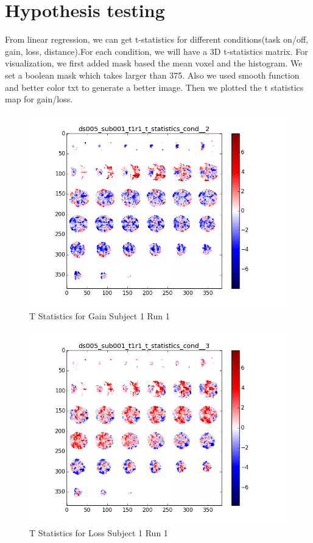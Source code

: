 \section {Hypothesis testing}
From linear regression, we can get t-statistics for different conditions(task on/off, gain, loss, distance).For each condition, we will have a 3D t-statistics matrix. For visualization, we first added mask based the mean voxel and the histogram. We set a boolean mask which takes larger than 375. Also we used smooth function and better color txt to generate a better image. Then we plotted the t statistics map for gain/loss. 
\begin{figure}[H] 
\centering \includegraphics[scale=0.5]{../fig/t_test/ds005_sub001_t1r1_t-test_cond2.png}	 
\caption{T Statistics for Gain Subject 1 Run 1}
\end{figure} 
\begin{figure}[H] 
\centering 
\includegraphics[scale=0.5]{../fig/t_test/ds005_sub001_t1r1_t-test_cond3.png} 
\caption{T Statistics for Loss Subject 1 Run 1}
\end{figure}
